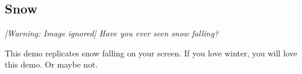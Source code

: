 
\subsection{Snow}
{\centering\itshape
  [Warning: Image ignored] %
 \newline
Have you ever seen snow falling?
\par}

This demo replicates snow falling on your screen. If you love winter,
you will love this demo.  Or maybe not.

